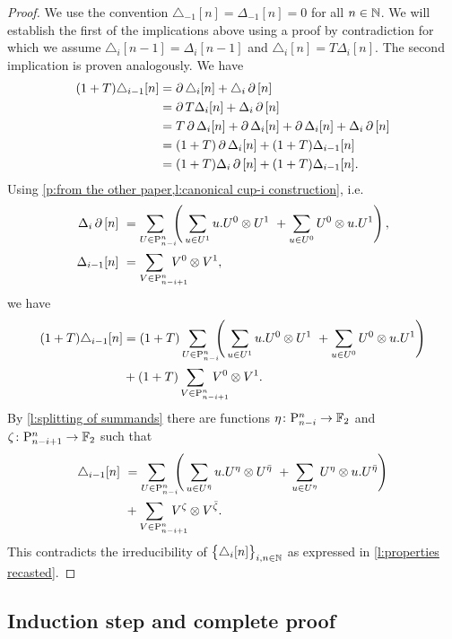 \begin{proof}
	We use the convention $\triangle_{-1} [n] = \Delta_{-1} [n] = 0$ for all $n \in \mathbb{N}$.
	We will establish the first of the implications above using a proof by contradiction for which we assume $\triangle_i [n-1] = \Delta_i [n-1]$ and $\triangle_i [n] = T \Delta_i [n]$.
	The second implication is proven analogously.
	We have
	\begin{align*}
	(1+T) \triangle_{i-1}[n] &=
	\operatorname{\partial} \triangle_i [n] + \triangle_i \operatorname{\partial} \, [n] \\ &=
	\operatorname{\partial} T \Delta_i [n] + \Delta_i \operatorname{\partial} \, [n] \\ &=
	T \operatorname{\partial} \Delta_i [n] + \operatorname{\partial} \Delta_i [n] + \operatorname{\partial} \Delta_i [n] + \Delta_i \operatorname{\partial} \, [n] \\ &=
	(1+T) \operatorname{\partial} \Delta_i [n] + (1+T) \Delta_{i-1} [n] \\ &=
	(1+T) \Delta_i \operatorname{\partial} \, [n] + (1+T) \Delta_{i-1} [n].
	\end{align*}
	Using \cref{p:from the other paper,l:canonical cup-i construction}, i.e.
	\[
	\begin{split}
	\Delta_i \bd \, [n] \ &=
	\sum_{U \in \P_{n-i}^n \kern-5pt} \left( \,
	\sum_{u \in U^1} {u.U^0} \ot {U^1} \ +
	\sum_{u \in U^0} {U^0} \ot {u.U^1} \right), \\
	\Delta_{i-1} [n] \ &=
	\sum_{V \in \P_{n-i+1}^n \kern-15pt} V^0 \ot V^1,
	\end{split}
	\]
	we have
	\begin{align*}
	(1+T) \triangle_{i-1}[n] &=
	(1+T) \sum_{U \in \P_{n-i}^n \kern-5pt} \left( \,
	\sum_{u \in U^1} {u.U^0} \ot {U^1} \ +
	\sum_{u \in U^0} {U^0} \ot {u.U^1} \right) \\ &+
	(1+T) \sum_{V \in \P_{n-i+1}^n \kern-15pt} V^0 \ot V^1.
	\end{align*}
	By \cref{l:splitting of summands} there are functions $\eta \colon \mathrm{P}_{n-i}^n \to {\mathbb{F}_2}$ and $\zeta \colon \mathrm{P}_{n-i+1}^n \to {\mathbb{F}_2}$ such that
	\begin{align*}
	\triangle_{i-1}[n] \ &=
	\sum_{U \in \P_{n-i}^n \kern-5pt} \left( \,
	\sum_{u \in U^\bareta} u.U^\eta \ot U^\bareta \ +
	\sum_{u \in U^\eta} U^\eta \ot u.U^\bareta \right) \\ &+
	\sum_{V \in \P_{n-i+1}^n \kern-15pt} V^\zeta \ot V^\barzeta.
	\end{align*}
	This contradicts the irreducibility of $\big\{ \triangle_i [n] \big\}_{i,n\in\mathbb{N}}$ as expressed in \cref{l:properties recasted}.
\end{proof}

\subsection{Induction step and complete proof} \label{ss:step}

